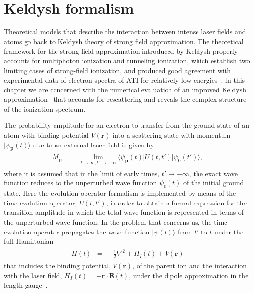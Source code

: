 \section{\label{sec:keldysh} Keldysh formalism}




Theoretical models that describe the interaction between intense laser
fields and atoms go back to Keldysh theory of strong field
approximation. The theoretical framework for the strong-field
approximation introduced by Keldysh properly accounts for multiphoton
ionization and tunneling ionization, which establish two limiting
cases of strong-field ionization, and produced good agreement with
experimental data of electron spectra of ATI for relatively low
energies~\cite{Walker_1994exp}. In this chapter we are concerned with
the numerical evaluation of an improved Keldysh
approximation~\cite{Kopold_1997sfa} that accounts for rescattering and
reveals the complex structure of the ionization spectrum.

The probability amplitude for an electron to transfer from the ground
state of an atom with binding potential $V(\mathbf{r})$ into a
scattering state with momentum $|\psi_{\mathbf{p}}(t)\rangle$ due to
an external laser field is given by~\cite{Kopold_1997sfa}
\begin{eqnarray}
\label{eq:matrix_element}
\begin{split}
M_{\mathbf{p}} & = & \lim_{t\to\infty,t'\to -\infty}
{\langle \psi_{\mathbf{p}}(t) | U(t,t') | \psi_{0}(t') \rangle},
\end{split}
\end{eqnarray}
where it is assumed that in the limit of early times, $t'\to -\infty$,
the exact wave function reduces to the unperturbed wave function
$\psi_{0}(t)$ of the initial ground state. Here the evolution operator
formalism is implemented by means of the time-evolution operator,
$U(t, t')$, in order to obtain a formal expression for the transition
amplitude in which the total wave function is represented in terms of
the unperturbed wave function. In the problem that concerns us, the
time-evolution operator propagates the wave function $|\psi(t)\rangle$
from $t'$ to $t$ under the full Hamiltonian
\begin{eqnarray}
\label{eq:H_ati}
\begin{split}
H(t) & = & -\frac{1}{2} \nabla^{2} + H_{I}(t) + V(\mathbf{r})
\end{split}
\end{eqnarray}
that includes the binding potential, $V(\mathbf{r})$, of the parent
ion and the interaction with the laser field,
$H_{I}(t)=-\mathbf{r}\cdot\mathbf{E}(t)$, under the dipole
approximation in the length gauge~\cite{Kopold_1997sfa}.

